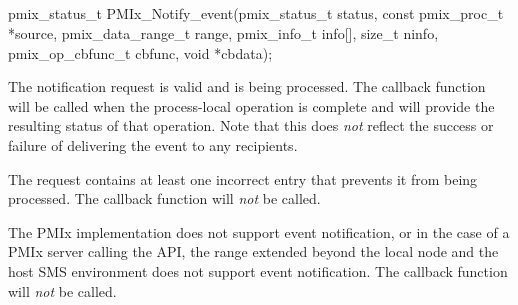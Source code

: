 \subsection{}

\cspecificstart
\begin{codepar}
pmix_status_t
PMIx_Notify_event(pmix_status_t status,
                  const pmix_proc_t *source,
                  pmix_data_range_t range,
                  pmix_info_t info[], size_t ninfo,
                  pmix_op_cbfunc_t cbfunc, void *cbdata);
\end{codepar}
\cspecificend

\begin{arglist}
\end{arglist}

\begin{constantdesc}
\item {} The notification request is valid and is being processed. The callback function will be called when the process-local operation is complete and will provide the resulting status of that operation. Note that this does \textit{not} reflect the success or failure of delivering the event to any recipients.
\item {} The request contains at least one incorrect entry that prevents it from being processed. The callback function will \textit{not} be called.
\item {} The \ac{PMIx} implementation does not support event notification, or in the case of a \ac{PMIx} server calling the API, the range extended beyond the local node and the host \ac{SMS} environment does not support event notification. The callback function will \textit{not} be called.
\end{constantdesc}

